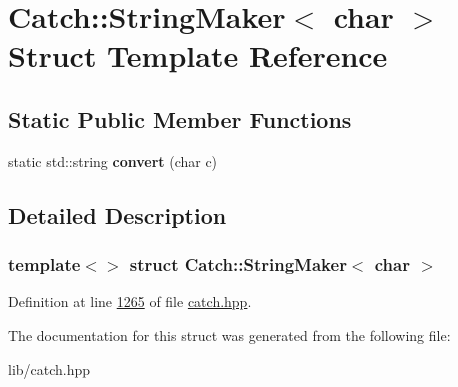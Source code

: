 \hypertarget{structCatch_1_1StringMaker_3_01char_01_4}{}\section{Catch\+::String\+Maker$<$ char $>$ Struct Template Reference}
\label{structCatch_1_1StringMaker_3_01char_01_4}
\subsection*{Static Public Member Functions}
\begin{DoxyCompactItemize}
\item 
\mbox{\label{structCatch_1_1StringMaker_3_01char_01_4_a4e3db69a12bb83f3ef89251893e65da5}} 
static std\+::string {\bfseries convert} (char c)
\end{DoxyCompactItemize}


\subsection{Detailed Description}
\subsubsection*{template$<$$>$\newline
struct Catch\+::\+String\+Maker$<$ char $>$}



Definition at line \mbox{\hyperlink{catch_8hpp_source_l01265}{1265}} of file \mbox{\hyperlink{catch_8hpp_source}{catch.\+hpp}}.



The documentation for this struct was generated from the following file\+:\begin{DoxyCompactItemize}
\item 
lib/catch.\+hpp\end{DoxyCompactItemize}
